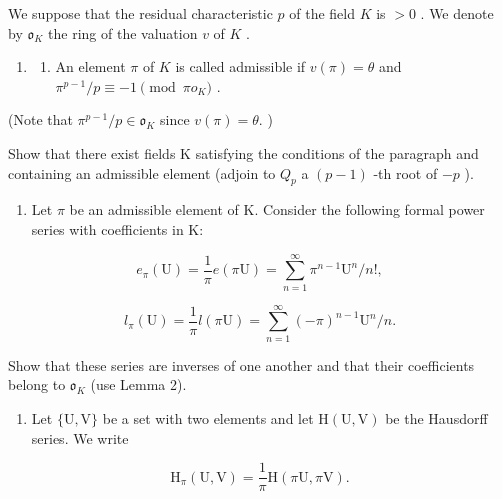 
We suppose that the residual characteristic \(p\) of the field \(K\) is \(>0\) . We denote by \(\mathfrak{o}_{K}\) the ring of the valuation \(v\) of \(K\) .

\begin{enumerate}
\def\labelenumi{\arabic{enumi}.}
\tightlist
\item
  \begin{enumerate}
  \def\labelenumii{(\alph{enumii})}
  \tightlist
  \item
    An element \(\pi\) of \(K\) is called admissible if \(v(\pi) = \theta\) and \(\pi^{p-1} / p \equiv -1 \pmod{\pi o_K}\) .
  \end{enumerate}
\end{enumerate}

(Note that \(\pi^{p-1}/p\in\mathfrak{o}_{K}\) since \(v(\pi)=\theta.\) )

Show that there exist fields K satisfying the conditions of the paragraph and containing an admissible element (adjoin to \(Q_{p}\) a \((p - 1)\) -th root of \(-p\) ).

\begin{enumerate}
\def\labelenumi{(\alph{enumi})}
\setcounter{enumi}{1}
\tightlist
\item
  Let \(\pi\) be an admissible element of K. Consider the following formal power series with coefficients in K:
\end{enumerate}

\[
e _ {\pi} (\mathrm{U}) = \frac {1}{\pi} e (\pi \mathrm{U}) = \sum_ {n = 1} ^ {\infty} \pi^ {n - 1} \mathrm{U} ^ {n} / n!,
\]

\[
l _ {\pi} (\mathrm{U}) = \frac {1}{\pi} l (\pi \mathrm{U}) = \sum_ {n = 1} ^ {\infty} (- \pi) ^ {n - 1} \mathrm{U} ^ {n} / n.
\]

Show that these series are inverses of one another and that their coefficients belong to \(\mathfrak{o}_{K}\) (use Lemma 2).

\begin{enumerate}
\def\labelenumi{(\alph{enumi})}
\setcounter{enumi}{2}
\tightlist
\item
  Let \(\{\mathrm{U},\mathrm{V}\}\) be a set with two elements and let \(\mathrm{H}(\mathrm{U},\mathrm{V})\) be the Hausdorff series. We write
\end{enumerate}

\[
\mathrm{H} _ {\pi} (\mathrm{U}, \mathrm{V}) = \frac {1}{\pi} \mathrm{H} (\pi \mathrm{U}, \pi \mathrm{V}).
\]


